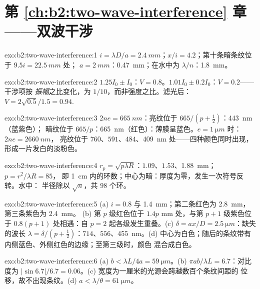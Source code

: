 \section*{第 \ref{ch:b2:two-wave-interference} 章——双波干涉}

\begin{solution}{exo:b2:two-wave-interference:1}
$i = \lambda D/a = \qty{2.4}{mm}$；$x/i = 4.2$；第十条暗条纹位于 $9.5i = \qty{22.5}{mm}$ 处；
$a = \qty{2}{mm}$：\qty{0.47}{mm}；在水中为 $\lambda/n$：\qty{1.8}{mm}。
\end{solution}

\begin{solution}{exo:b2:two-wave-interference:2}
$1.25I_0 \pm I_0$：$V = 0.8$。$1.01I_0 \pm 0.2I_0$：$V = 0.2$——干涉项按
\emph{振幅}之比变化，为 $1/10$，而非强度之比。滤光后：
$V = 2\sqrt{0.5}/1.5 = 0.94$.
\end{solution}

\begin{solution}{exo:b2:two-wave-interference:3}
$2ne = \qty{665}{nm}$：亮纹位于 $665/(p + \tfrac12)$：\qty{443}{nm}（蓝紫色）；
暗纹位于 $665/p$：\qty{665}{nm}（红色）：薄膜呈蓝色。$e = \qty{1}{\micro m}$ 时：$2ne = \qty{2660}{nm}$，
亮纹位于 $760$、$591$、$484$、\qty{409}{nm} 处——四种颜色同时出现，
形成一片发白的淡粉色。
\end{solution}

\begin{solution}{exo:b2:two-wave-interference:4}
$r_p = \sqrt{p\lambda R}$：$1.09$、$1.53$、\qty{1.88}{mm}；$p = r^2/\lambda R = 85$，
即 \qty{1}{cm} 内的环数；中心为暗：厚度为零，发生一次符号反转。水中：
半径除以 $\sqrt n$，共 $98$ 个环。
\end{solution}

\begin{solution}{exo:b2:two-wave-interference:5}
(a) $i = 0.8$ 与 \qty{1.4}{mm}；第二条红色为 \qty{2.8}{mm}，第三条紫色为 \qty{2.4}{mm}。
(b) 第 $p$ 级红色位于 $1.4p$ mm 处，与第 $p + 1$ 级紫色位于 $0.8(p + 1)$ 处相遇：自
$p = 2$ 起各级发生重叠。(c) $\delta = ax/D = \qty{2.5}{\micro m}$：缺失的波长 $\lambda = \delta/(p +
\tfrac12)$：$714$、$556$、\qty{455}{nm}。(d) 中心为白色；随后的条纹带有
内侧蓝色、外侧红色的边缘；至第三级时，颜色
混合成白色。
\end{solution}

\begin{solution}{exo:b2:two-wave-interference:6}
(a) $b < \lambda L/4a = \qty{59}{\micro m}$。(b) $\pi ab/\lambda L = 6.7$：对比度为 $|\sin6.7|/6.7
= 0.06$。(c) 宽度为一厘米的光源会跨越数百个条纹间距的
位移，故不出现条纹。(d) $a < \lambda/\theta = \qty{61}{\micro m}$。
\end{solution}

